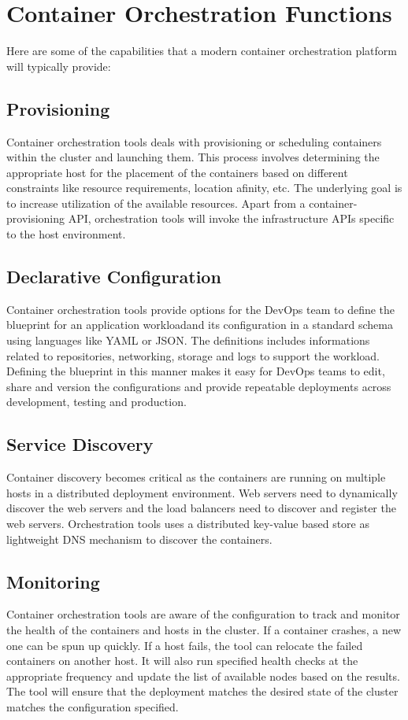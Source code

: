 \documentclass[sigconf]{acmart}
\begin{document}
	\section{Container Orchestration Functions }
	Here are some of the capabilities that a modern container orchestration platform will typically provide:
	\subsection{Provisioning}
	Container orchestration tools deals with provisioning or scheduling containers within the cluster and launching them.
	This process involves determining the appropriate host for the placement of the containers based on different constraints like
	resource requirements, location afinity, etc. The underlying goal is to increase utilization of the available resources.
	Apart from a container-provisioning API, orchestration tools will invoke the infrastructure APIs specific to the host 
	environment. \cite{Provisioning}
	\subsection{Declarative Configuration}
	Container orchestration tools provide options for the DevOps team to define the blueprint for an application workloadand its
	configuration in a standard schema using languages like YAML or JSON. The definitions includes informations related to repositories,
	networking, storage and logs to support the workload. Defining the blueprint in this manner makes it easy for DevOps teams to edit, 
	share and version the configurations and provide repeatable	deployments across development, testing and production.  \cite{Configuration-as-text}
	\subsection{Service Discovery}
	Container discovery becomes critical as the containers are running on multiple hosts in a distributed deployment environment.
	Web servers need to dynamically discover the web servers and the load balancers need to discover and register the web servers.
	Orchestration tools uses a distributed  key-value based  store as lightweight DNS mechanism to discover the containers.
	\subsection{Monitoring}
	Container orchestration tools are aware of the configuration to track and monitor the health of the containers and hosts in the cluster. 
	If a container crashes, a new one can be spun up quickly. If a host fails, the tool can relocate the failed containers on another host.
	It will also run specified health checks at the appropriate frequency and update the list of available nodes based on the results. The tool will 
	ensure that the deployment matches the desired state of the cluster matches the configuration specified. 
\end{document}
